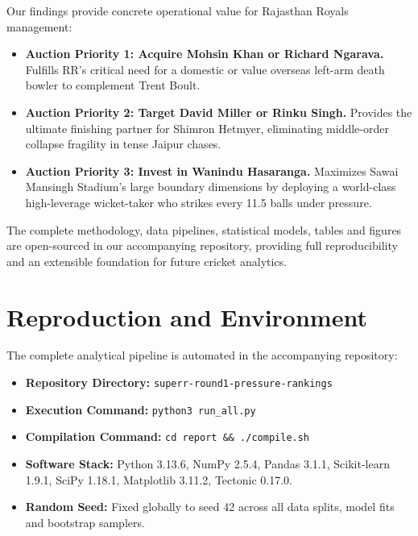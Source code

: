\documentclass[11pt,a4paper]{article}
\begin{document}
Our findings provide concrete operational value for Rajasthan Royals management:
\begin{itemize}
    \item \textbf{Auction Priority 1: Acquire Mohsin Khan or Richard Ngarava.} Fulfills RR's critical need for a domestic or value overseas left-arm death bowler to complement Trent Boult.
    \item \textbf{Auction Priority 2: Target David Miller or Rinku Singh.} Provides the ultimate finishing partner for Shimron Hetmyer, eliminating middle-order collapse fragility in tense Jaipur chases.
    \item \textbf{Auction Priority 3: Invest in Wanindu Hasaranga.} Maximizes Sawai Mansingh Stadium's large boundary dimensions by deploying a world-class high-leverage wicket-taker who strikes every 11.5 balls under pressure.
\end{itemize}
The complete methodology, data pipelines, statistical models, tables and figures are open-sourced in our accompanying repository, providing full reproducibility and an extensible foundation for future cricket analytics.

\newpage
\appendix

\section{Reproduction and Environment}
\label{app:reproduction}
The complete analytical pipeline is automated in the accompanying repository:
\begin{itemize}
    \item \textbf{Repository Directory:} \texttt{superr-round1-pressure-rankings}
    \item \textbf{Execution Command:} \texttt{python3 run\_all.py}
    \item \textbf{Compilation Command:} \texttt{cd report \&\& ./compile.sh}
    \item \textbf{Software Stack:} Python 3.13.6, NumPy 2.5.4, Pandas 3.1.1, Scikit-learn 1.9.1, SciPy 1.18.1, Matplotlib 3.11.2, Tectonic 0.17.0.
    \item \textbf{Random Seed:} Fixed globally to seed 42 across all data splits, model fits and bootstrap samplers.
\end{itemize}
\end{document}
